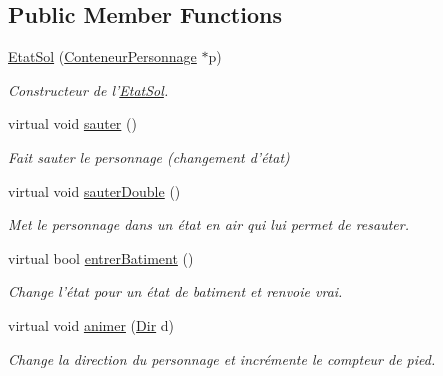 \subsection*{Public Member Functions}
\begin{DoxyCompactItemize}
\item 
\hyperlink{classEtatSol_a280880d1981e782c4485326c7c3688ef}{Etat\-Sol} (\hyperlink{classConteneurPersonnage}{Conteneur\-Personnage} $\ast$p)
\begin{DoxyCompactList}\small\item\em Constructeur de l'\hyperlink{classEtatSol}{Etat\-Sol}. \end{DoxyCompactList}\item 
\hypertarget{classEtatSol_a259588c898117c25b40402b4d7de3479}{virtual void \hyperlink{classEtatSol_a259588c898117c25b40402b4d7de3479}{sauter} ()}\label{classEtatSol_a259588c898117c25b40402b4d7de3479}

\begin{DoxyCompactList}\small\item\em Fait sauter le personnage (changement d'état) \end{DoxyCompactList}\item 
\hypertarget{classEtatSol_a2f2dba4b724234ca79ff641d1030f4f8}{virtual void \hyperlink{classEtatSol_a2f2dba4b724234ca79ff641d1030f4f8}{sauter\-Double} ()}\label{classEtatSol_a2f2dba4b724234ca79ff641d1030f4f8}

\begin{DoxyCompactList}\small\item\em Met le personnage dans un état en air qui lui permet de resauter. \end{DoxyCompactList}\item 
\hypertarget{classEtatSol_afaf895167e50600aad3e6fa13ba64168}{virtual bool \hyperlink{classEtatSol_afaf895167e50600aad3e6fa13ba64168}{entrer\-Batiment} ()}\label{classEtatSol_afaf895167e50600aad3e6fa13ba64168}

\begin{DoxyCompactList}\small\item\em Change l'état pour un état de batiment et renvoie vrai. \end{DoxyCompactList}\item 
virtual void \hyperlink{classEtatSol_a96ffba82bc3ff07ae9eabcccead8ec89}{animer} (\hyperlink{Espace_8h_a7cf6e8c5a5bc5e7b2afef3647870b1c4}{Dir} d)
\begin{DoxyCompactList}\small\item\em Change la direction du personnage et incrémente le compteur de pied. \end{DoxyCompactList}\end{DoxyCompactItemize}
